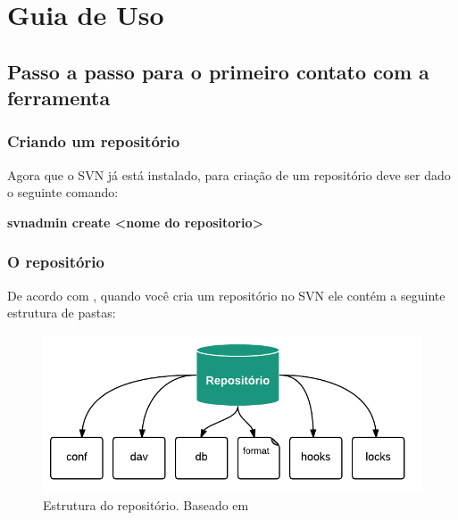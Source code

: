 \chapter[Guia de Uso]{Guia de Uso}

\section{Passo a passo para o primeiro contato com a ferramenta}

\subsection{Criando um repositório}

Agora que o SVN já está instalado, para criação de um repositório deve ser dado o seguinte comando:

\begin{centering}

\colorbox{PineGreen}{
\begin{minipage}{250px}
  \textbf{svnadmin create <nome do repositorio>}

\end{minipage}
}
\end{centering}

\subsection{O repositório}

De acordo com \cite{svn-book}, quando você cria um repositório no SVN ele contém a seguinte estrutura de pastas:

\begin{figure}[!htb]
\centering
\includegraphics[scale=1]{figuras/repositorio.png}
\caption{Estrutura do repositório. Baseado em \cite{svn-book}}
\end{figure}


